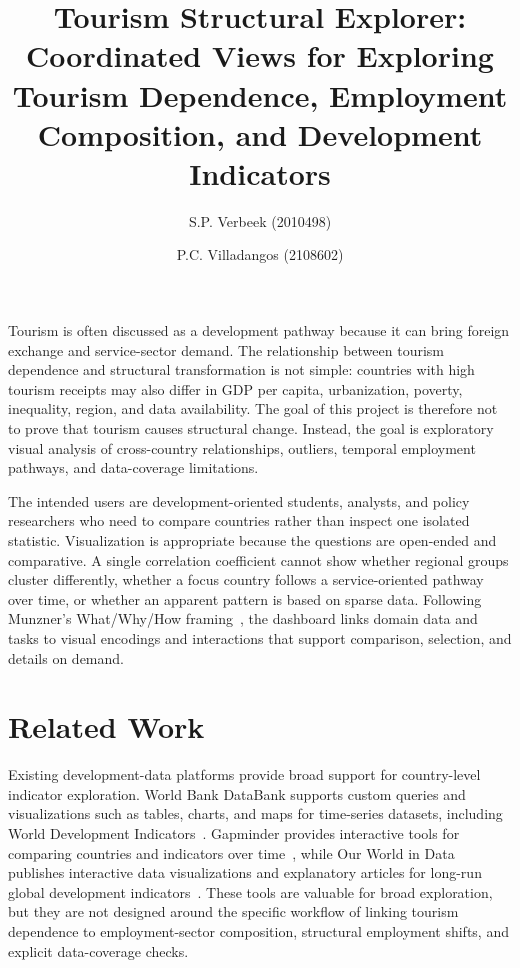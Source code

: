 \documentclass{vgtc}
\title{Tourism Structural Explorer: Coordinated Views for Exploring Tourism Dependence, Employment Composition, and Development Indicators}
\author{S.P. Verbeek (2010498)\and P.C. Villadangos (2108602)}
\begin{document}
\maketitle

Tourism is often discussed as a development pathway because it can bring foreign exchange and service-sector demand. The relationship between tourism dependence and structural transformation is not simple: countries with high tourism receipts may also differ in GDP per capita, urbanization, poverty, inequality, region, and data availability. The goal of this project is therefore not to prove that tourism causes structural change. Instead, the goal is exploratory visual analysis of cross-country relationships, outliers, temporal employment pathways, and data-coverage limitations.

The intended users are development-oriented students, analysts, and policy researchers who need to compare countries rather than inspect one isolated statistic. Visualization is appropriate because the questions are open-ended and comparative. A single correlation coefficient cannot show whether regional groups cluster differently, whether a focus country follows a service-oriented pathway over time, or whether an apparent pattern is based on sparse data. Following Munzner's What/Why/How framing~\cite{munzner2014}, the dashboard links domain data and tasks to visual encodings and interactions that support comparison, selection, and details on demand.

\section{Related Work}

Existing development-data platforms provide broad support for country-level indicator exploration. World Bank DataBank supports custom queries and visualizations such as tables, charts, and maps for time-series datasets, including World Development Indicators~\cite{worldbank_databank}. Gapminder provides interactive tools for comparing countries and indicators over time~\cite{gapminder_tools}, while Our World in Data publishes interactive data visualizations and explanatory articles for long-run global development indicators~\cite{owid}. These tools are valuable for broad exploration, but they are not designed around the specific workflow of linking tourism dependence to employment-sector composition, structural employment shifts, and explicit data-coverage checks.
\end{document}
